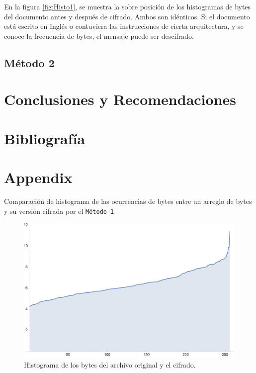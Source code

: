 \documentclass[a4paper]{article}
\begin{document}
En la figura \ref{fig:Histo1}, se muestra la sobre posición de los histogramas
de bytes del documento antes y después de cifrado. Ambos son idénticos. Si el
documento está escrito en Inglés o contuviera las instrucciones de cierta
arquitectura, y se conoce la frecuencia de bytes, el mensaje puede ser
descifrado.

\subsection{Método 2}

\newpage
\section{Conclusiones y Recomendaciones}

\newpage
\section{Bibliografía}
\printbibliography[heading=none]

\newpage

\appendix

\section{Appendix}

Comparación de histograma de las ocurrencias de bytes entre un arreglo de bytes
y su versión cifrada por el \texttt{Método 1}

\begin{figure}[H]
    \centering
    \includegraphics[scale=0.7]{historygramorig}
    \caption*{Histograma de los bytes del archivo
original y el cifrado.}\label{fig:d1}
\end{figure}
\end{document}
